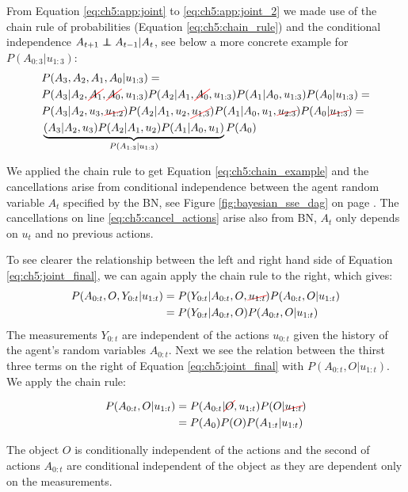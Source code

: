\begin{appendices}
From Equation \ref{eq:ch5:app:joint} to \ref{eq:ch5:app:joint_2} we made use of the chain rule 
of probabilities (Equation \ref{eq:ch5:chain_rule}) and the conditional independence $A_{t+1} \independent A_{t-1} | A_t$, see below a more concrete example for $P(A_{0:3}|u_{1:3})$:
\begin{align}
  &P(A_3,A_2,A_1,A_0|u_{1:3}) = \nonumber \\ 
  &P(A_3|A_2,\Ccancel[red]{A_1},\Ccancel[red]{A_0},u_{1:3})P(A_2|A_1,\Ccancel[red]{A_0},u_{1:3})P(A_1|A_0,u_{1:3}) P(A_0|u_{1:3}) = \label{eq:ch5:chain_example} \\
  &P(A_3|A_2,u_3,\Ccancel[red]{u_{1:2}})P(A_2|A_1,u_2,\Ccancel[red]{u_{1,3}})P(A_1|A_0,u_1,\Ccancel[red]{u_{2:3}}) P(A_0|\Ccancel[red]{u_{1:3}}) = \label{eq:ch5:cancel_actions} \\
  &\underbrace{(A_3|A_2,u_3) P(A_2|A_1,u_2) P(A_1|A_0,u_1)}_{P(A_{1:3}|u_{1:3})} P(A_0)
\end{align}

We applied the chain rule to get Equation \ref{eq:ch5:chain_example} and the cancellations arise from 
conditional independence between the agent random variable $A_t$ specified by the BN, 
see Figure \ref{fig:bayesian_sse_dag} on page \pageref{fig:bayesian_sse_dag}. The cancellations on line \ref{eq:ch5:cancel_actions}
arise also from BN, $A_t$ only depends on $u_t$ and no previous actions.


To see clearer the relationship between the left and right hand side of Equation \ref{eq:ch5:joint_final}, 
we can again apply the chain rule to the right, which gives:
\begin{align}
 P(A_{0:t},O,Y_{0:t}|u_{1:t}) &=  P(Y_{0:t}|A_{0:t},O,\Ccancel[red]{u_{1:t}}) P(A_{0:t},O|u_{1:t}) \\
			      &=  P(Y_{0:t}|A_{0:t},O) P(A_{0:t},O|u_{1:t})
\end{align}
The measurements $Y_{0:t}$ are independent of the actions $u_{0:t}$  given the history of the agent's random 
variables $A_{0:t}$. Next we see the relation between the thirst three terms on the right of Equation \ref{eq:ch5:joint_final}
with $P(A_{0:t},O|u_{1:t})$. We apply the chain rule:

\begin{align}
 P(A_{0:t},O|u_{1:t}) &= P(A_{0:t}|\Ccancel[red]{O},u_{1:t}) P(O|\Ccancel[red]{u_{1:t}}) \\
		      &= P(A_0) P(O) P(A_{1:t}|u_{1:t}) 
\end{align}

The object $O$ is conditionally independent of the actions and the second of actions $A_{0:t}$ are conditional independent 
of the object as they are dependent only on the measurements.


\end{appendices}
